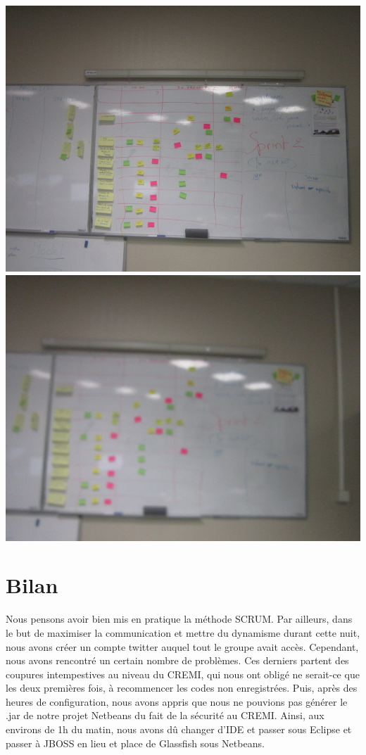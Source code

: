 \documentclass[a4paper,francais,titlepage]{report}
\begin{document}
\begin{center}
\includegraphics[scale=0.3]{tableau2.jpeg}
\includegraphics[scale=0.3]{tableau3.jpeg}
\end{center}
\newpage
\section{Bilan}
Nous pensons avoir bien mis en pratique la méthode SCRUM. Par ailleurs, dans le but de maximiser la communication et mettre du dynamisme durant cette nuit, nous avons créer un compte twitter auquel tout le groupe avait accès. Cependant, nous avons rencontré un certain nombre de problèmes.
Ces derniers partent des coupures intempestives au niveau du CREMI, qui nous ont obligé ne serait-ce que les deux premières fois, à recommencer les codes non enregistrées.
Puis, après des heures de configuration, nous avons appris que nous ne pouvions pas générer le .jar de notre projet Netbeans du fait de la sécurité au CREMI. 
Ainsi, aux environs de 1h du matin, nous avons dû changer d'IDE et passer sous Eclipse et passer à JBOSS en lieu et place de Glassfish sous Netbeans.
\end{document}
